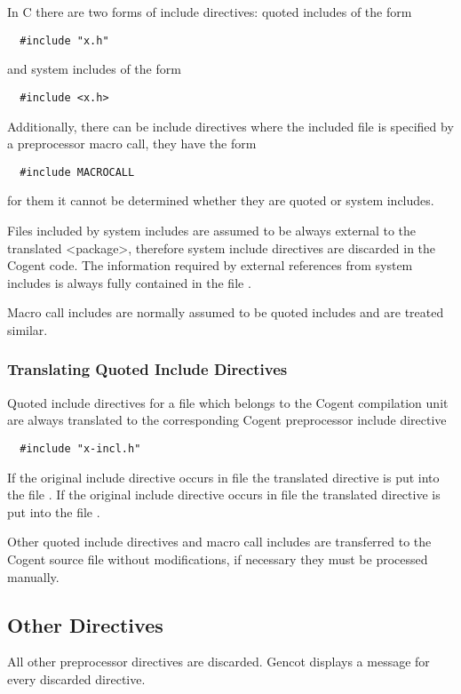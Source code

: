 In C there are two forms of include directives: quoted includes of the form
\begin{verbatim}
  #include "x.h"
\end{verbatim}
and system includes of the form
\begin{verbatim}
  #include <x.h>
\end{verbatim}
Additionally, there can be include directives where the included file is specified by a preprocessor macro call,
they have the form
\begin{verbatim}
  #include MACROCALL
\end{verbatim}
for them it cannot be determined whether they are quoted or system includes.

Files included by system includes are assumed to be always external to the translated <package>, therefore system
include directives are discarded in the Cogent code. The information required by external references from system 
includes is always fully contained in the file .

Macro call includes are normally assumed to be quoted includes and are treated similar.

\subsubsection{Translating Quoted Include Directives}

Quoted include directives for a file  which belongs to the Cogent compilation unit are always translated 
to the corresponding Cogent preprocessor include directive
\begin{verbatim}
  #include "x-incl.h"
\end{verbatim}
If the original include directive occurs in file  the translated directive is put into the file 
. If the original include directive occurs in file  the translated directive is put into the file
. 

Other quoted include directives and macro call includes are transferred to the Cogent source file without modifications, if
necessary they must be processed manually.

\subsection{Other Directives}

All other preprocessor directives are discarded. Gencot displays a message for every discarded directive.

 
